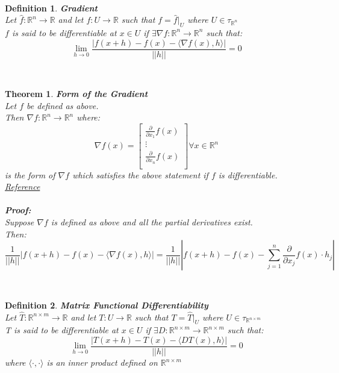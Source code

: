 \documentclass[12pt]{extarticle}
\theoremstyle{plain}
\newtheorem{thm}{Theorem}[section]
\theoremstyle{plain}
\theoremstyle{plain}
\theoremstyle{Definition}
\newtheorem{def.}{Definition}[section]
\theoremstyle{Definition}
\theoremstyle{plain}
\newcommand{\cut}[0]{\noindent\framebox[\linewidth]{\rule{\linewidth}{2pt}}\\}
\begin{document}
\cut
\begin{def.} \textbf{Gradient} \\ 
	Let $\hat{f} : \mathbb{R}^n \to \mathbb{R}$ and let $f : U \to \mathbb{R}$ such that $f = \hat{f}|_U$ where $U \in \tau_{\mathbb{R}^n}$ \\ 
	$f$ is said to be differentiable at $x \in U$ if $\exists \nabla f : \mathbb{R}^n \to \mathbb{R}^n$ such that: \\  	
	$$\lim_{h \to 0}\frac{|f(x + h) - f(x) - \langle \nabla f(x),h \rangle|}{||h||} = 0$$ 
\end{def.} 
\cut
\begin{thm} \textbf{Form of the Gradient} \\ 
	Let $f$ be defined as above. \\ 
	Then $\nabla f: \mathbb{R}^n \to \mathbb{R}^n$ where: \\ 
	\[
	\nabla f(x) = 
	\begin{bmatrix}
	\frac{\partial }{\partial x_1}f(x) \\ 
	\vdots \\
	\frac{\partial }{\partial x_n}f(x) \\ 				
	\end{bmatrix}
	\forall x \in \mathbb{R}^n
	\]
	is the form of $\nabla f$ which satisfies the above statement if $f$ is differentiable. \\
	\href{https://en.wikipedia.org/wiki/Gradient}{Reference} \\ \\
	\textbf{Proof:} \\ 
	Suppose $\nabla f$ is defined as above and all the partial derivatives exist. \\ 
	Then: 
	$$\frac{1}{||h||} |f(x + h) - f(x) - \langle \nabla f(x),h \rangle| = \frac{1}{||h||} \left|f(x + h) - f(x) - \sum_{j=1}^n \frac{\partial}{\partial x_j} f(x)\cdot h_j\right|$$
\end{thm}
\cut
\newpage
\begin{def.} \textbf{Matrix Functional Differentiability} \\ 
	Let $\hat{T} : \mathbb{R}^{n \times m} \to \mathbb{R}$ and let $T : U \to \mathbb{R}$ such that $T = \hat{T}|_U$ where $U \in \tau_{\mathbb{R}^{n \times m}}$ \\ 
	T is said to be differentiable at $x \in U$ if $\exists D : \mathbb{R}^{n \times m} \to \mathbb{R}^{n \times m}$ such that: \\  
	$$\lim_{h \to 0}\frac{|T(x + h) - T(x) - \langle D T(x),h \rangle|}{||h||} = 0$$
	where $\langle \cdot, \cdot \rangle$ is an inner product defined on $\mathbb{R}^{n \times m}$
\end{def.}
\end{document}
